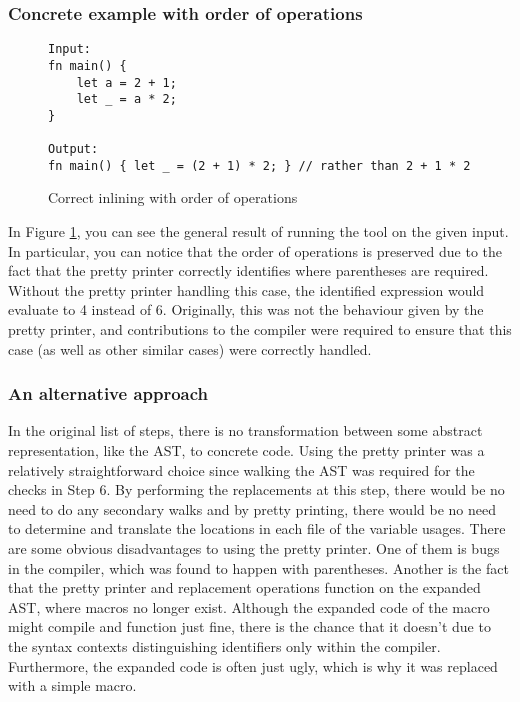 \subsubsection{Concrete example with order of operations}

\begin{figure}[h]
\centering
\begin{verbatim}
Input:
fn main() {
    let a = 2 + 1;
    let _ = a * 2;
}

Output:
fn main() { let _ = (2 + 1) * 2; } // rather than 2 + 1 * 2
\end{verbatim}
\caption{Correct inlining with order of operations}
\label{Fig:exinline}
\end{figure}

In Figure \ref{Fig:exinline}, you can see the general result of running the tool on the given input. In particular, you can notice that the order of operations is preserved due to the fact that the pretty printer correctly identifies where parentheses are required. Without the pretty printer handling this case, the identified expression would evaluate to 4 instead of 6. Originally, this was not the behaviour given by the pretty printer, and contributions to the compiler were required to ensure that this case (as well as other similar cases) were correctly handled.

\subsubsection{An alternative approach}
In the original list of steps, there is no transformation between some abstract representation, like the AST, to concrete code. Using the pretty printer was a relatively straightforward choice since walking the AST was required for the checks in Step 6. By performing the replacements at this step, there would be no need to do any secondary walks and by pretty printing, there would be no need to determine and translate the locations in each file of the variable usages. There are some obvious disadvantages to using the pretty printer. One of them is bugs in the compiler, which was found to happen with parentheses. Another is the fact that the pretty printer and replacement operations function on the expanded AST, where macros no longer exist. Although the expanded code of the macro might compile and function just fine, there is the chance that it doesn't due to the syntax contexts distinguishing identifiers only within the compiler. Furthermore, the expanded code is often just ugly, which is why it was replaced with a simple macro.

